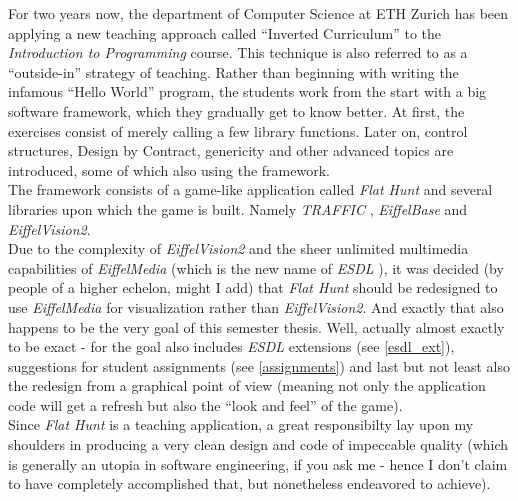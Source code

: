 For two years now, the department of Computer Science at ETH Zurich has been applying a new teaching approach called ``Inverted Curriculum'' \cite{bm03} \cite{mp03} \cite{mk04} to the \emph{Introduction to Programming} course. This technique is also referred to as a ``outside-in'' strategy of teaching. Rather than beginning with writing the infamous ``Hello World'' program, the students work from the start with a big software framework, which they gradually get to know better. At first, the exercises consist of merely calling a few library functions. Later on, control structures, Design by Contract, genericity and other advanced topics are introduced, some of which also using the framework.\\
The framework consists of a game-like application called \emph{Flat Hunt} and several libraries upon which the game is built. Namely \emph{TRAFFIC} \cite{sa05}, \emph{EiffelBase} and \emph{EiffelVision2}.\\

Due to the complexity of \emph{EiffelVision2} and the sheer unlimited multimedia capabilities of \emph{EiffelMedia} (which is the new name of \emph{ESDL} \cite{bb04} \cite{tgb03} \cite{rb05}), it was decided (by people of a higher echelon, might I add) that \emph{Flat Hunt} should be redesigned to use \emph{EiffelMedia} for visualization rather than \emph{EiffelVision2}. And exactly that also happens to be the very goal of this semester thesis. Well, actually almost exactly to be exact - for the goal also includes \emph{ESDL} extensions (see \autoref{esdl_ext}), suggestions for student assignments (see \autoref{assignments}) and last but not least also the redesign from a graphical point of view (meaning not only the application code will get a refresh but also the ``look and feel'' of the game).\\

Since \emph{Flat Hunt} is a teaching application, a great responsibilty lay upon my shoulders in producing a very clean design and code of impeccable quality (which is generally an utopia in software engineering, if you ask me - hence I don't claim to have completely accomplished that, but nonetheless endeavored to achieve). 
